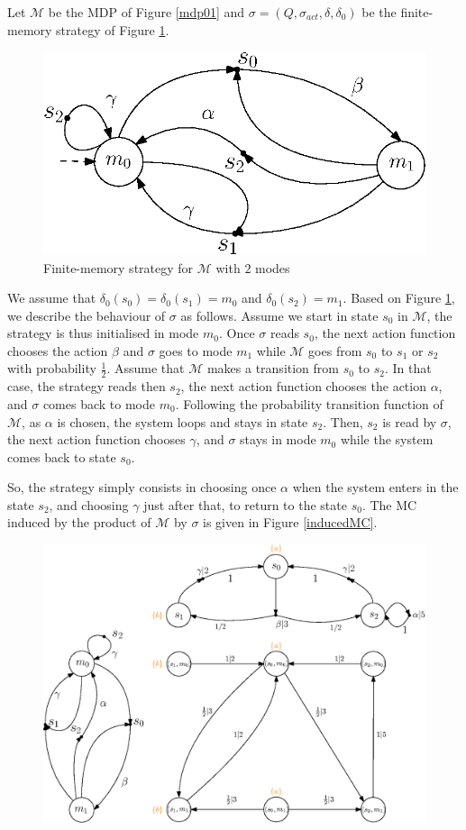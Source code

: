 \begin{example}
  Let $\mathcal{M}$ be the MDP of Figure \ref{mdp01} and $\sigma = (Q, \sigma_{act}, \delta, \delta_0)$ be the
  finite-memory strategy of Figure \ref{finite_mem_strat}.
  \begin{figure}[h!]
    \centering
    \includegraphics[width=0.4\linewidth]{resources/strategy}
    \caption{Finite-memory strategy for $\mathcal{M}$ with $2$ modes}\label{finite_mem_strat}
  \end{figure}
  We assume that $\delta_0(s_0) = \delta_0(s_1) = m_0$ and $\delta_0(s_2) = m_1$.
  Based on Figure \ref{finite_mem_strat}, we describe the behaviour of $\sigma$ as follows.
  Assume we start in state $s_0$ in $\mathcal{M}$, the strategy is thus initialised in mode $m_0$.
  Once $\sigma$ reads $s_0$, the next action function chooses the action $\beta$ and $\sigma$ goes to mode $m_1$ while $\mathcal{M}$ goes from $s_0$ to $s_1$ or $s_2$ with probability $\frac{1}{2}$.
  Assume that $\mathcal{M}$ makes a transition from $s_0$ to $s_2$.
  In that case, the strategy reads then $s_2$, the next action function chooses the action $\alpha$, and $\sigma$ comes back to mode $m_0$.
  Following the probability transition function of $\mathcal{M}$, as $\alpha$ is chosen, the system loops and stays in state $s_2$. Then, $s_2$ is read by $\sigma$, the next action function chooses $\gamma$, and $\sigma$ stays in mode $m_0$ while the system comes back to state $s_0$.
  \par So, the strategy simply consists in choosing once $\alpha$ when the system enters in the state $s_2$, and choosing $\gamma$ just after that, to return to the state $s_0$. The MC induced by the product of $\mathcal{M}$ by $\sigma$ is given in Figure
  \ref{inducedMC}.
  \begin{figure}[H]
    \centering
    \includegraphics[width=0.7\linewidth]{resources/inductedmarkov}

\end{figure}
\end{example}
